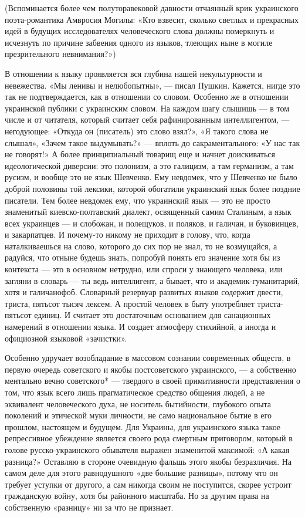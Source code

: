 (Вспоминается более чем полуторавековой давности отчаянный крик украинского
поэта-романтика Амвросия Могилы: «Кто взвесит, сколько светлых и прекрасных
идей в будущих исследователях человеческого слова должны померкнуть и исчезнуть
по причине забвения одного из языков, тлеющих ныне в могиле презрительного
невнимания?»)

В отношении к языку проявляется вся глубина нашей некультурности и невежества.
«Мы ленивы и нелюбопытны», --- писал Пушкин. Кажется, нигде это так не
подтверждается, как в отношении со словом. Особенно же в отношении украинской
публики с украинским словом. На каждом шагу слышишь --- в том числе и от
читателя, который считает себя рафинированным интеллигентом, —негодующее:
«Откуда он (писатель) это слово взял?», «Я такого слова не слышал», «Зачем
такое выдумывать?» --- вплоть до сакраментального: «У нас так не говорят!» А
более принципиальный товарищ еще и начнет доискиваться идеологической диверсии:
это полонизм, а это галицизм, а там германизм, а там русизм, и вообще это не
язык Шевченко. Ему невдомек, что у Шевченко не было доброй половины той
лексики, которой обогатили украинский язык более поздние писатели. Тем более
невдомек ему, что украинский язык --- это не просто знаменитый киевско-полтавский
диалект, освященный самим Сталиным, а язык всех украинцев --- и слобожан, и
полещуков, и поляков, и галичан, и буковинцев, и закарпатцев. И почему-то
никому не приходит в голову, что, когда наталкиваешься на слово, которого до
сих пор не знал, то не возмущайся, а радуйся, что отныне будешь знать, попробуй
понять его значение хотя бы из контекста --- это в основном нетрудно, или спроси
у знающего человека, или загляни в словарь --- ты ведь интеллигент, а бывает, что
и академик-гуманитарий, хотя и галичанофоб. Словарный резервуар развитых языков
содержит двести, триста, пятьсот тысяч лексем. А простой человек в быту
употребляет триста-пятьсот единиц. И считает это достаточным основанием для
санационных намерений в отношении языка. И создает атмосферу стихийной, а
иногда и официозной языковой «зачистки».

Особенно удручает возобладание в массовом сознании современных обществ, в
первую очередь советского и якобы постсоветского украинского, --- а собственно
ментально вечно советского* --- твердого в своей примитивности представления о
том, что язык всего лишь прагматическое средство общения людей, а не эквивалент
человеческого духа, не носитель бытийности, глубокого опыта поколений и
этической муки личности, не само национальное бытие в его прошлом, настоящем и
будущем. Для Украины, для украинского языка такое репрессивное убеждение
является своего рода смертным приговором, который в голове русско-украинского
обывателя выражен знаменитой максимой: «А какая разница?» Оставляю в стороне
очевидную фальшь этого якобы безразличия. На самом деле для этого равнодушного
«две большие разницы», потому что он требует уступки от другого, а сам никогда
своим не поступится, скорее устроит гражданскую войну, хотя бы районного
масштаба. Но за другим права на собственную «разницу» ни за что не признает.

